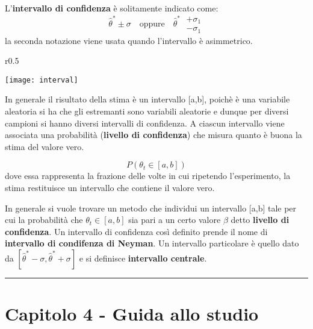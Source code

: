 \noindent L'\textbf{intervallo di confidenza} \`{e} solitamente indicato come:
\begin{equation}
	\hat{\theta}^* \pm \sigma \quad \text{oppure} \quad \hat{\theta}^* \; \begin{matrix}
		+\sigma_1 \\ - \sigma_1
	\end{matrix}
\end{equation}
la seconda notazione viene usata quando l'intervallo \`{e} asimmetrico. \newline
\begin{wrapfigure}{r}{0.5 \textwidth}

\vspace{-10pt}
\centering
\texttt{[image: interval]}	

\end{wrapfigure}
In generale il risultato della stima \`{e} un intervallo [a,b], poich\`{e} \`{e} una variabile aleatoria si ha che gli estremanti sono variabili aleatorie e dunque per diversi campioni si hanno diversi intervalli di confidenza. A ciascun intervallo viene associata una probabilit\`{a} (\textbf{livello di confidenza}) che misura quanto \`{e} buona la stima del valore vero.

\begin{equation*}
	P(\theta_t \in [a,b])
\end{equation*}
dove essa rappresenta la frazione delle volte in cui ripetendo l'esperimento, la stima restituisce un intervallo che contiene il valore vero.\newline

In generale si vuole trovare un metodo che individui un intervallo [a,b] tale per cui la probabilit\`{a} che $\theta_t \in [a,b]$ sia pari a un certo valore $\beta$ detto \textbf{livello di confidenza}. Un intervallo di confidenza cos\`{i} definito prende il nome di \textbf{intervallo di condifenza di Neyman}. Un intervallo particolare \`{e} quello dato da $[\hat{\theta}^* - \sigma, \hat{\theta}^* + \sigma]$ e si definisce \textbf{intervallo centrale}.

\vspace{0.5cm}
\par\noindent\rule{\textwidth}{2pt}

\section{Capitolo 4 - Guida allo studio}

